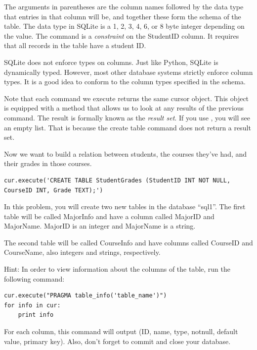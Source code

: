 The arguments in parentheses are the column names followed by the data type that entries in that column will be,
and together these form the schema of the table.
The  data type in SQLite is a 1, 2, 3, 4, 6, or 8 byte integer depending on the value.
The  command is a \emph{constraint} on the StudentID column.  It requires that all records in the table have a student ID.

\begin{info}
SQLite does not enforce types on columns.
Just like Python, SQLite is dynamically typed.
However, most other database systems strictly enforce column types.
It is a good idea to conform to the column types specified in the schema.
\end{info}


Note that each command we execute returns the same cursor object.  This object is equipped with a method that allows us to look
at any results of the previous command.  The result is formally known as the \emph{result set}.
If you use , you will see an empty list.
That is because the create table command does not return a result set.

Now we want to build a relation between students, the courses they've had, and their grades in those courses.
\begin{lstlisting}
cur.execute('CREATE TABLE StudentGrades (StudentID INT NOT NULL, CourseID INT, Grade TEXT);')
\end{lstlisting}

\begin{problem}
In this problem, you will create two new tables in the database ``sql1''.
The first table will be called MajorInfo and have a column called MajorID and MajorName.
MajorID is an integer and MajorName is a string.

The second table will be called CourseInfo and have columns called CourseID and CourseName, also integers and strings, respectively.

Hint: In order to view information about the columns of the table, run the following command:
\begin{lstlisting}
cur.execute("PRAGMA table_info('table_name')")
for info in cur:
    print info
\end{lstlisting}
For each column, this command will output (ID, name, type, notnull, default value, primary key).  Also, don't forget to commit and close your database.
\label{prob:new_tables}
\end{problem}

